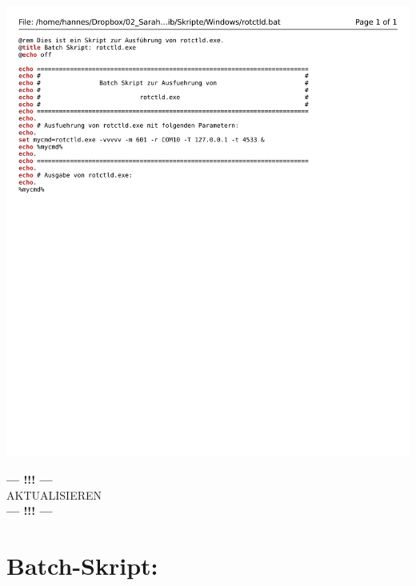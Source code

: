 \begin{center}
	\includegraphics[width=1\textwidth]{./appendicies/rotctld}
\end{center}

\begin{center}
	\Large{\textbf{--- !!! ---}\\AKTUALISIEREN\\\textbf{--- !!! ---}}
\end{center}


\chapter{Batch-Skript: }
\label{chap:rotctlbat}


